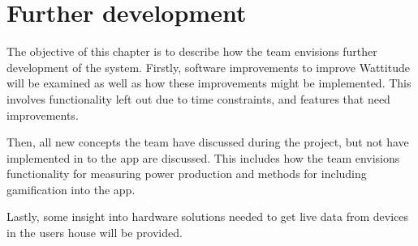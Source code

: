 \chapter{Further development}
\label{sec:further}
The objective of this chapter is to describe how the team envisions further development of the system. Firstly, software improvements to improve Wattitude will be examined as well as how these improvements might be implemented. This involves functionality left out due to time constraints, and features that need improvements. 

Then, all new concepts the team have discussed during the project, but not have implemented in to the app are discussed. This includes how the team envisions functionality for measuring power production and methods for including gamification into the app. 

Lastly, some insight into hardware solutions needed to get live data from devices in the users house will be provided. 





